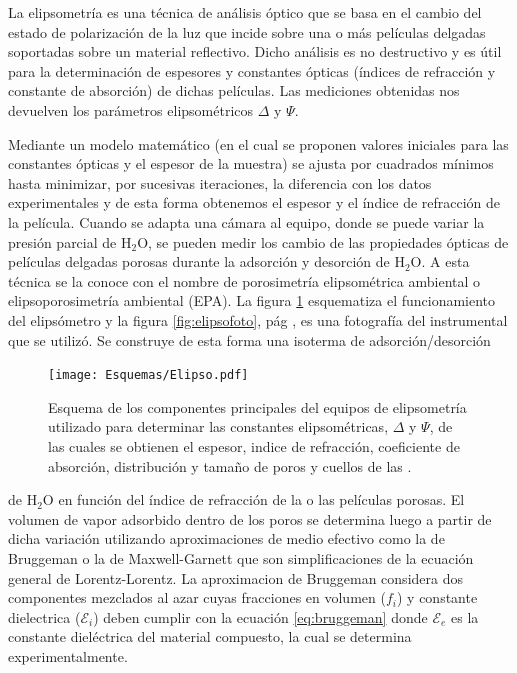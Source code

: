 		La elipsometría es una técnica de análisis óptico que se basa en el cambio del estado de polarización de la luz que incide sobre una o más películas delgadas soportadas sobre un material reflectivo. Dicho análisis es no destructivo y es útil para la determinación de espesores y constantes ópticas (índices de refracción y constante de absorción) de dichas películas.\cite{TompkinsHarlandG.1999,Rothen1945} Las mediciones obtenidas nos devuelven los parámetros elipsométricos $\Delta$ y $\Psi$. 

		Mediante un modelo matemático (en el cual se proponen valores iniciales para las constantes ópticas y el espesor de la muestra) se ajusta por cuadrados mínimos hasta minimizar, por sucesivas iteraciones, la diferencia con los datos experimentales y de esta forma obtenemos el espesor y el índice de refracción de la película. Cuando se adapta una cámara al equipo, donde se puede variar la presión parcial de H$_2$O, se pueden medir los cambio de las propiedades ópticas de películas delgadas porosas durante la adsorción y desorción de H$_2$O. A esta técnica se la conoce con el nombre de porosimetría elipsométrica ambiental o elipsoporosimetría ambiental (EPA). La figura \ref{fig:elipso} esquematiza el funcionamiento del elipsómetro y la figura \ref{fig:elipsofoto}, pág \pageref{fig:elipsofoto}, es una fotografía del instrumental que se utilizó. Se construye de esta forma una isoterma de adsorción/desorción 
			  \begin{figure}[t]
			  \begin{center}
			  \texttt{[image: Esquemas/Elipso.pdf]}
			  \caption[Esquema de la técncia de elipsoporosimetría ambiental]{Esquema de los componentes principales del equipos de elipsometría utilizado para determinar las constantes elipsométricas, $\Delta$ y $\Psi$, de las cuales se obtienen el espesor, indice de refracción, coeficiente de absorción, distribución y tamaño de poros y cuellos de las \pdm.}
			  \label{fig:elipso}
			  \end{center}
			  \end{figure}
		de H$_2$O en función del índice de refracción de la o las películas porosas.\cite{Baklanov2000,Boissiere2005,Sing1985} El volumen de vapor adsorbido dentro de los poros se determina luego a partir de dicha variación utilizando aproximaciones de medio efectivo como la de Bruggeman\cite{Bruggeman1935} o la de Maxwell-Garnett\cite{Garnett1906} que son simplificaciones de la ecuación general de Lorentz-Lorentz\cite{TompkinsHarlandG.1999}.
		La aproximacion de Bruggeman considera dos componentes mezclados al azar cuyas fracciones en volumen ($f_i$) y constante dielectrica ($\mathcal{E}_i$) deben cumplir con la ecuación \ref{eq:bruggeman} donde $\mathcal{E}_e$ es la constante dieléctrica del material compuesto, la cual se determina experimentalmente.
